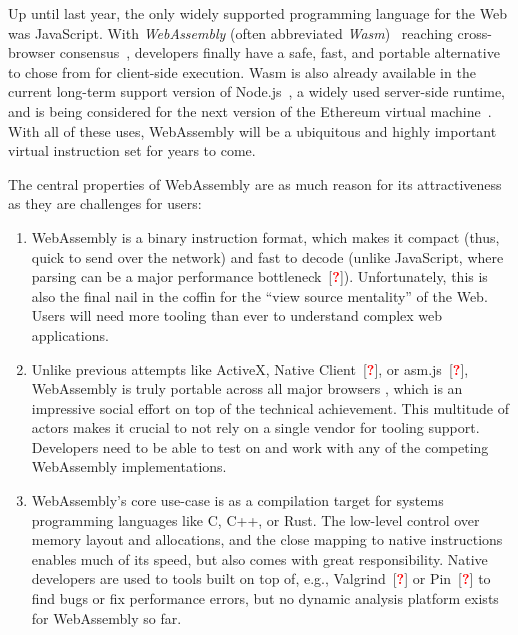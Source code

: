 \documentclass[sigplan,review,anonymous]{acmart}\settopmatter{printfolios=true,printccs=false,printacmref=false}
\newcommand{\citeTodo}{[\textcolor{red}{\bfseries?}]}
\begin{document}
Up until last year, the only widely supported programming language for the Web was JavaScript. With \emph{WebAssembly} (often abbreviated \emph{Wasm})~\cite{Haas:2017:BWU:3062341.3062363, WasmWebsite} reaching cross-browser consensus~\cite{WasmConsensus}, developers finally have a safe, fast, and portable alternative to chose from for client-side execution. Wasm is also already available in the current long-term support version of Node.js~\cite{NodejsWebsite}, a widely used server-side runtime, and is being considered for the next version of the Ethereum virtual machine~\cite{EthereumWasm}. With all of these uses, WebAssembly will be a ubiquitous and highly important virtual instruction set for years to come.

The central properties of WebAssembly are as much reason for its attractiveness as they are challenges for users: 

\begin{enumerate}[topsep=0pt, wide]
	\item WebAssembly is a binary instruction format, which makes it compact (thus, quick to send over the network) and fast to decode (unlike JavaScript, where parsing can be a major performance bottleneck~\citeTodo). Unfortunately, this is also the final nail in the coffin for the \enquote{view source mentality} of the Web. Users will need more tooling than ever to understand complex web applications.
	
	\item Unlike previous attempts like ActiveX, Native Client~\citeTodo, or asm.js~\citeTodo, WebAssembly is truly portable across all major browsers%
	, which is an impressive social effort on top of the technical achievement. This multitude of actors makes it crucial to not rely on a single vendor for tooling support. Developers need to be able to test on and work with any of the competing WebAssembly implementations.
	 
	\item WebAssembly's core use-case is as a compilation target for systems programming languages like C, C++, or Rust. The low-level control over memory layout and allocations, and the close mapping to native instructions enables much of its speed, but also comes with great responsibility. Native developers are used to tools built on top of, e.g., Valgrind~\citeTodo{} or Pin~\citeTodo{} to find bugs or fix performance errors, but no dynamic analysis platform exists for WebAssembly so far.
	
\end{enumerate}
\end{document}

